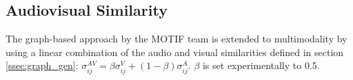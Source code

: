 \subsection{Audiovisual Similarity}

The graph-based approach by the MOTIF team is extended to multimodality by using a linear combination of the audio and visual similarities defined in section \ref{ssec:graph_gen}: $\sigma^{AV}_{ij} = \beta \sigma^V_{ij} + (1-\beta) \sigma^A_{ij}$. $\beta$ is set experimentally to 0.5.

\endinput
